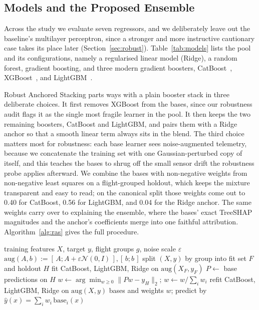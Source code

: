 \documentclass[conference]{IEEEtran}
\begin{document}
\subsection{Models and the Proposed Ensemble}
Across the study we evaluate seven regressors, and we deliberately leave out the baseline's multilayer perceptron, since a stronger and more instructive cautionary case takes its place later (Section~\ref{sec:robust}). Table~\ref{tab:models} lists the pool and its configurations, namely a regularised linear model (Ridge), a random forest, gradient boosting, and three modern gradient boosters, CatBoost~\cite{prokhorenkova2018catboost}, XGBoost~\cite{chen2016xgboost}, and LightGBM~\cite{ke2017lightgbm}.

Robust Anchored Stacking parts ways with a plain booster stack in three deliberate choices. It first removes XGBoost from the bases, since our robustness audit flags it as the single most fragile learner in the pool. It then keeps the two remaining boosters, CatBoost and LightGBM, and pairs them with a Ridge anchor so that a smooth linear term always sits in the blend. The third choice matters most for robustness: each base learner sees noise-augmented telemetry, because we concatenate the training set with one Gaussian-perturbed copy of itself, and this teaches the bases to shrug off the small sensor drift the robustness probe applies afterward. We combine the bases with non-negative weights from non-negative least squares on a flight-grouped holdout, which keeps the mixture transparent and easy to read; on the canonical split those weights come out to 0.40 for CatBoost, 0.56 for LightGBM, and 0.04 for the Ridge anchor. The same weights carry over to explaining the ensemble, where the bases' exact TreeSHAP magnitudes and the anchor's coefficients merge into one faithful attribution. Algorithm~\ref{alg:ras} gives the full procedure.

\begin{algorithm}[t]
\caption{Robust Anchored Stacking (training)}
\label{alg:ras}
\small
\begin{algorithmic}[1]
\REQUIRE training features $X$, target $y$, flight groups $g$, noise scale $\varepsilon$
\STATE $\mathrm{aug}(A,b)\!:=\![\,A;A{+}\varepsilon\mathcal{N}(0,I)\,],[\,b;b\,]$ 
\STATE split $(X,y)$ by group into fit set $F$ and holdout $H$
\STATE fit CatBoost, LightGBM, Ridge on $\mathrm{aug}(X_F,y_F)$
\STATE $P \leftarrow$ base predictions on $H$
\STATE $w \leftarrow \arg\min_{w\ge 0}\lVert Pw - y_H\rVert_2$; \; $w \leftarrow w/\textstyle\sum_i w_i$ 
\STATE refit CatBoost, LightGBM, Ridge on $\mathrm{aug}(X,y)$
\ENSURE bases and weights $w$; predict by $\hat{y}(x)=\sum_i w_i\,\mathrm{base}_i(x)$
\end{algorithmic}
\end{algorithm}
\end{document}

